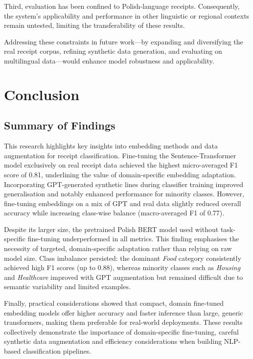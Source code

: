 \documentclass{SGGW-thesis-EN}
\begin{document}
Third, evaluation has been confined to Polish-language receipts. Consequently, the system’s applicability and
performance in other linguistic or regional contexts remain untested, limiting the transferability of these results.

Addressing these constraints in future work—by expanding and diversifying the real receipt corpus, refining
synthetic data generation, and evaluating on multilingual data—would enhance model robustness and applicability.


\chapter{Conclusion}

\section{Summary of Findings}
This research highlights key insights into embedding methods and data augmentation for receipt classification.
Fine-tuning the Sentence-Transformer model exclusively on real receipt data achieved
the highest micro-averaged F1 score of 0.81, underlining the value of domain-specific embedding
adaptation. Incorporating GPT-generated synthetic lines during classifier training improved generalisation and
notably enhanced performance for minority classes. However, fine-tuning embeddings on a mix of GPT and real data
slightly reduced overall accuracy while increasing class-wise balance (macro-averaged F1 of 0.77).

Despite its larger size, the pretrained Polish BERT model used
without task-specific fine-tuning underperformed in all metrics. This finding emphasises the necessity of targeted,
domain-specific adaptation rather than relying on raw model size. Class imbalance persisted: the dominant
\emph{Food} category consistently achieved high F1 scores (up to 0.88), whereas minority classes
such as \emph{Housing} and \emph{Healthcare} improved with GPT augmentation but remained difficult due to semantic
variability and limited examples.

Finally, practical considerations showed that compact, domain fine-tuned embedding models offer higher accuracy
and faster inference than large, generic transformers, making them preferable for real-world deployments. These
results collectively demonstrate the importance of domain-specific fine-tuning, careful synthetic data augmentation
and efficiency considerations when building NLP-based classification pipelines.
\end{document}
